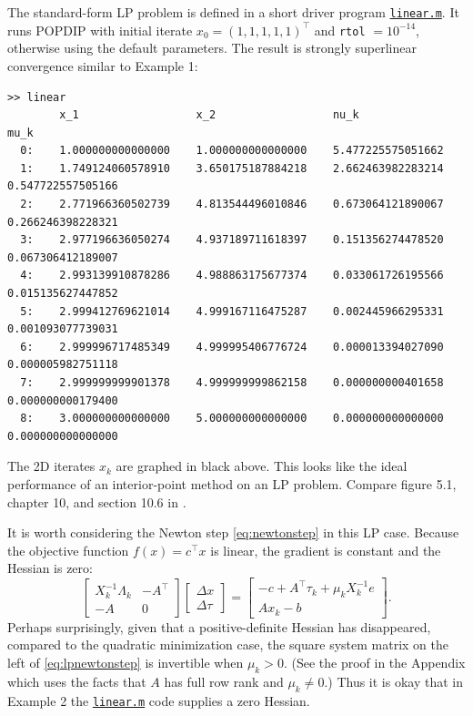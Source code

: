 \documentclass[11pt]{article}
\begin{document}
The standard-form LP problem is defined in a short driver program \href{https://github.com/bueler/popdip/blob/main/matlab/linear.m}{\texttt{linear.m}}.  It runs POPDIP with initial iterate $x_0=(1,1,1,1,1)^\top$ and \texttt{rtol} $=10^{-14}$, otherwise using the default parameters.  The result is strongly superlinear convergence similar to Example 1:
\begin{Verbatim}[fontsize=\footnotesize]
>> linear
        x_1                  x_2                  nu_k                 mu_k
  0:    1.000000000000000    1.000000000000000    5.477225575051662
  1:    1.749124060578910    3.650175187884218    2.662463982283214    0.547722557505166
  2:    2.771966360502739    4.813544496010846    0.673064121890067    0.266246398228321
  3:    2.977196636050274    4.937189711618397    0.151356274478520    0.067306412189007
  4:    2.993139910878286    4.988863175677374    0.033061726195566    0.015135627447852
  5:    2.999412769621014    4.999167116475287    0.002445966295331    0.001093077739031
  6:    2.999996717485349    4.999995406776724    0.000013394027090    0.000005982751118
  7:    2.999999999901378    4.999999999862158    0.000000000401658    0.000000000179400
  8:    3.000000000000000    5.000000000000000    0.000000000000000    0.000000000000000
\end{Verbatim}

The 2D iterates $x_k$ are graphed in black above.  This looks like the ideal performance of an interior-point method on an LP problem.  Compare figure 5.1, chapter 10, and section 10.6 in \cite{GrivaNashSofer2009}.

It is worth considering the Newton step \eqref{eq:newtonstep} in this LP case.  Because the objective function $f(x) = c^\top x$ is linear, the gradient is constant and the Hessian is zero:
\begin{equation}
\begin{bmatrix}
X_k^{-1}\Lambda_k  & -A^\top \\
-A                 & 0
\end{bmatrix}
\begin{bmatrix}
\Delta x \\
\Delta \tau
\end{bmatrix}
=
\begin{bmatrix}
-c + A^\top \tau_k + \mu_k X_k^{-1} e \\
A x_k - b
\end{bmatrix}. \label{eq:lpnewtonstep}
\end{equation}
Perhaps surprisingly, given that a positive-definite Hessian has disappeared, compared to the quadratic minimization case, the square system matrix on the left of \eqref{eq:lpnewtonstep} is invertible when $\mu_k>0$.  (See the proof in the Appendix which uses the facts that $A$ has full row rank and $\mu_k\ne 0$.)  Thus it is okay that in Example 2 the \href{https://github.com/bueler/popdip/blob/main/matlab/linear.m}{\texttt{linear.m}} code supplies a zero Hessian.
\end{document}

